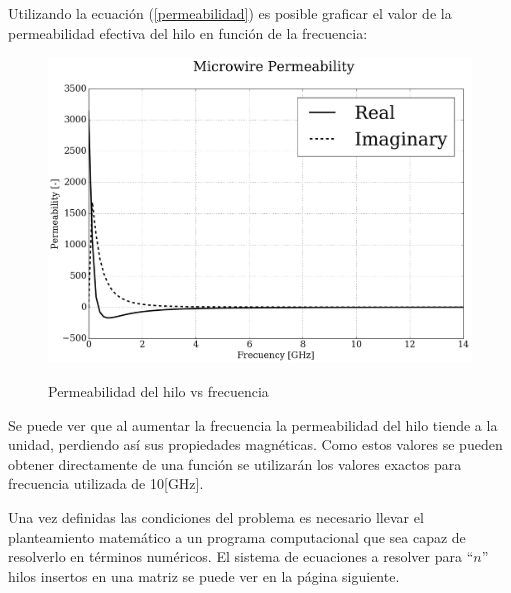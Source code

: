 \documentclass[12pt,letterpaper]{article}
\numberwithin{equation}{section}
\begin{document}
Utilizando la ecuación (\ref{permeabilidad}) es posible graficar el valor de la permeabilidad efectiva del hilo en función de la frecuencia:

\begin{figure}[H]
	\centering\includegraphics[scale=0.4]{Imagenes/wire_permeability.png}\\
	\caption{Permeabilidad del hilo vs frecuencia}
	\label{fig:wire_permeability}
\end{figure}

Se puede ver que al aumentar la frecuencia la permeabilidad del hilo tiende a la unidad, perdiendo así sus propiedades magnéticas. Como estos valores se pueden obtener directamente de una función se utilizarán los valores exactos para frecuencia utilizada de 10[GHz].

Una vez definidas las condiciones del problema es necesario llevar el planteamiento matemático a un programa computacional que sea capaz de resolverlo en términos numéricos. El sistema de ecuaciones a resolver para ``$n$'' hilos insertos en una matriz se puede ver en la página siguiente.
\end{document}
